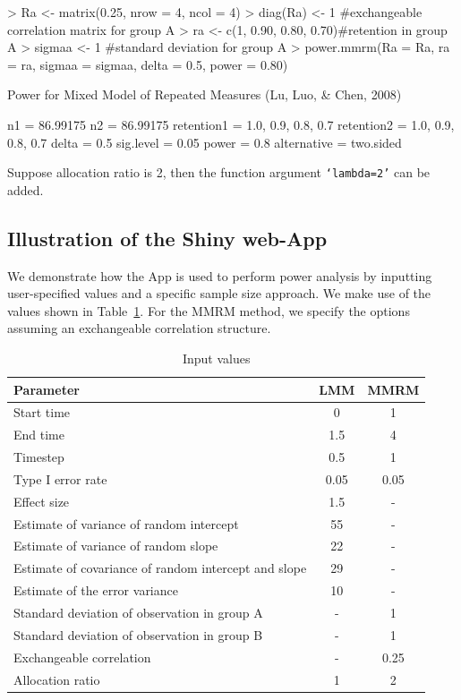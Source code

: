 \begin{mdframed}
\begin{example}
> Ra <- matrix(0.25, nrow = 4, ncol = 4)
> diag(Ra) <- 1 #exchangeable correlation matrix for group A
> ra <- c(1, 0.90, 0.80, 0.70)#retention in group A
> sigmaa <- 1 #standard deviation for group A
> power.mmrm(Ra = Ra, ra = ra, sigmaa = sigmaa, delta = 0.5, power = 0.80)

Power for Mixed Model of Repeated Measures (Lu, Luo, & Chen, 2008) 

n1 = 86.99175
n2 = 86.99175
retention1 = 1.0, 0.9, 0.8, 0.7
retention2 = 1.0, 0.9, 0.8, 0.7
delta = 0.5
sig.level = 0.05
power = 0.8
alternative = two.sided
\end{example}
\end{mdframed}
Suppose allocation ratio is 2, then the function argument \texttt{`lambda=2'} can be added. 

\subsection{Illustration of the Shiny web-App}
We demonstrate how the App is used to perform power analysis by inputting user-specified values and a specific sample size approach. We make use of the values shown in Table~\ref{parameters}. For the MMRM method, we specify the options assuming an exchangeable correlation structure.  

\begin{table}[ht]
	\caption{Input values}\label{parameters}
	\begin{tabular}{lcc}
		\hline\hline
		Parameter&	LMM&	MMRM\\
		\hline
		Start time&	0&1\\	
		End time&	1.5	&4\\
		Timestep&	0.5	&1\\
		Type I error rate&	0.05&0.05	\\
		Effect size	&1.5&-	\\
		Estimate of variance of random intercept&	55	&-\\
		Estimate of variance of random slope&	22&	-\\
		Estimate of covariance of random intercept and slope&	29	&- \\
		Estimate of the error variance&	10	&-\\
		Standard deviation of observation in group A&	-&	1\\
		Standard deviation of observation in group B&	-&	1\\
		Exchangeable correlation&-&		0.25\\
		Allocation ratio&	1&2	\\
		\hline\hline
	\end{tabular}
\end{table}
	
